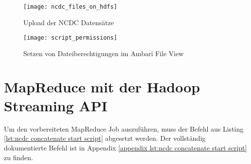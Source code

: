 \begin{figure}[ht]
    \centering
    \texttt{[image: ncdc\_files\_on\_hdfs]}
    \caption[Upload der NCDC Datensätze]{Upload der NCDC Datensätze}
    \label{fig:ncdc files hdfs}
    \texttt{[image: script\_permissions]}
    \caption[Setzen von Dateiberechtigungen im Ambari File View]{Setzen von Dateiberechtigungen im Ambari File View}
    \label{fig:concat script permissions}
\end{figure}


\section{MapReduce mit der Hadoop Streaming API}
\label{chap:fund sec:core sub:handson mapred streaming}
Um den vorbereiteten MapReduce Job auszuführen, muss der Befehl aus Listing \ref{lst:ncdc concatenate start script} abgesetzt werden. Der vollständig dokumentierte Befehl ist in Appendix \ref{appendix lst:ncdc concatenate start script} zu finden. 

